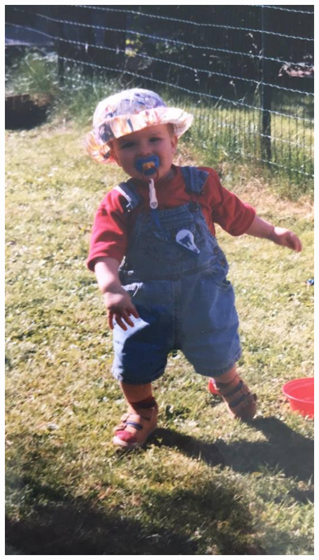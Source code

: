\begin{questions}
{\begin{center}
{\includegraphics[scale=0.20]{arend}}
\end{center}
\begin{flushleft}
\end{flushleft} }
\end{questions}

